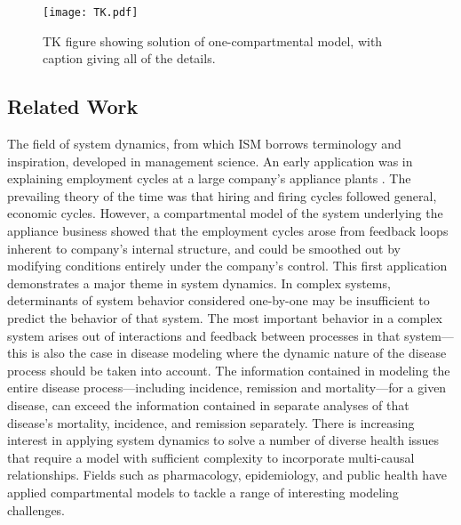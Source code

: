 \begin{figure}[h]
\begin{center}
\texttt{[image: TK.pdf]}
\caption{TK figure showing solution of one-compartmental model, with caption giving all of the details.}
\label{forward-sim-one-compartment-soln}
\end{center}
\end{figure}


\subsection{Related Work}

The field of system dynamics, from which ISM borrows terminology and inspiration, developed in management science. An early application was in explaining employment cycles at a large company's appliance plants \cite{Forrester_Counterintuitive_1971}. The prevailing theory of the time was that hiring and firing cycles followed general, economic cycles. However, a compartmental model of the system underlying the appliance business showed that the employment cycles arose from feedback loops inherent to company's internal structure, and could be smoothed out by modifying conditions entirely under the company's control. This first application demonstrates a major theme in system dynamics. In complex systems, determinants of system behavior considered one-by-one may be insufficient to predict the behavior of that system. The most important behavior in a complex system arises out of interactions and feedback between processes in that system---this is also the case in disease modeling where the dynamic nature of the disease process should be taken into account. The information contained in modeling the entire disease process---including incidence, remission and mortality---for a given disease, can exceed the information contained in separate analyses of that disease's mortality, incidence, and remission separately. There is increasing interest in applying system dynamics to solve a number of diverse health issues that require a model with sufficient complexity to incorporate multi-causal relationships. Fields such as pharmacology, epidemiology, and public health have applied compartmental models to tackle a range of interesting modeling challenges.

